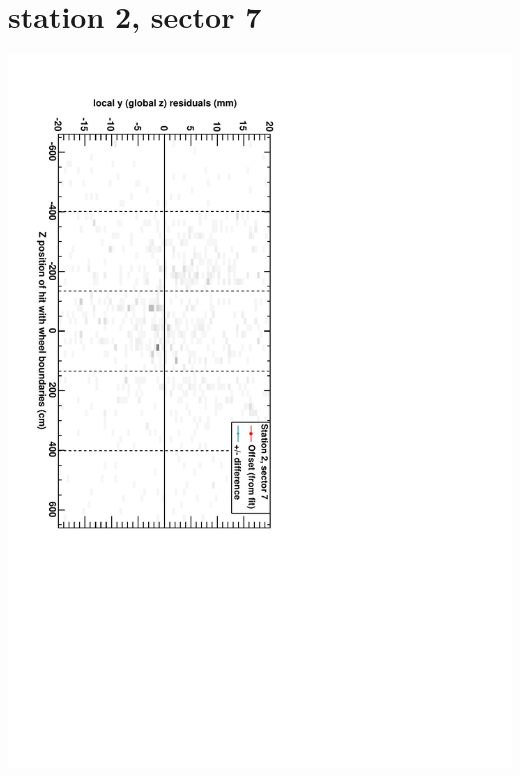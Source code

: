 \documentclass[compress]{beamer}
\begin{document}
\section*{station 2, sector 7}
\begin{frame} \vfill \mbox{\hspace{-1 cm}\includegraphics[height=1.2\linewidth, angle=90]{DTzVsZ_st2_sr07.pdf}} \end{frame}
\end{document}
